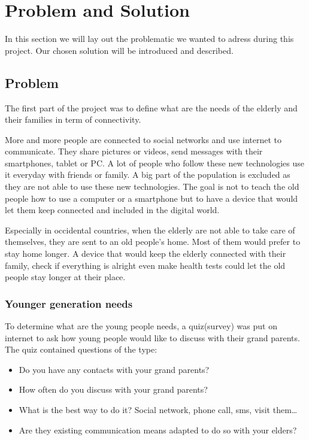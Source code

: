 \section{Problem and Solution}
In this section we will lay out the problematic we wanted to adress during this project. Our chosen solution will be introduced and described.
\subsection{Problem}
The first part of the project was to define what are the needs of the elderly and their families in term of connectivity.

More and more people are connected to social networks and use internet to communicate. They share pictures or videos, send messages with their smartphones, tablet or PC. A lot of people who follow these new technologies use it everyday with friends or family. A big part of the population is excluded as they are not able to use these new technologies. The goal is not to teach the old people how to use a computer or a smartphone but to have a device that would let them keep connected and included in the digital world.

Especially in occidental countries, when the elderly are not able to take care of themselves, they are sent to an old people's home. Most of them would prefer to stay home longer. A device that would keep the elderly connected with their family, check if everything is alright even make health tests could let the old people stay longer at their place.

\subsubsection{Younger generation needs}
To determine what are the young people needs, a quiz(survey) was put on internet to ask how young people would like to discuss with their grand parents.
The quiz contained questions of the type:
\begin{itemize}
\item{Do you have any contacts with your grand parents?}
\item{How often do you discuss with your grand parents?}
\item{What is the best way to do it? Social network, phone call, sms, visit them…}
\item{Are they existing communication means adapted to do so with your elders?}
\end{itemize}

